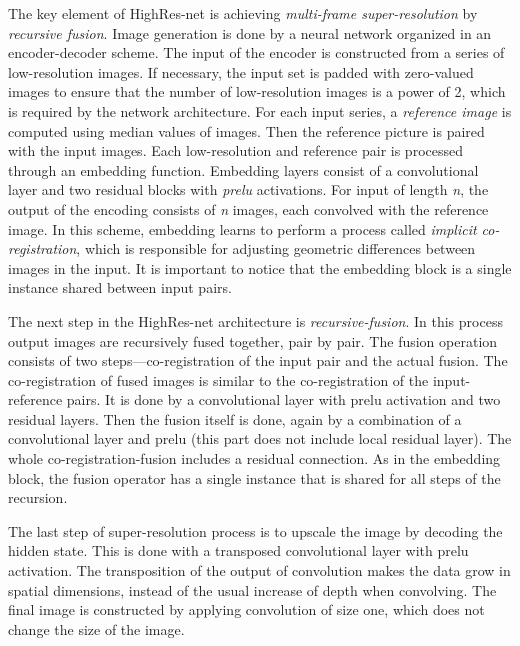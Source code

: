The key element of HighRes-net is achieving \textit{multi-frame super-resolution} by \textit{recursive fusion}.
Image generation is done by a neural network organized in an encoder-decoder scheme.
The input of the encoder is constructed from a series of low-resolution images.
If necessary, the input set is padded with zero-valued images to ensure that the number of low-resolution images is a power of 2, which is required by the network architecture.
For each input series, a \textit{reference image} is computed using median values of images.
Then the reference picture is paired with the input images.
Each low-resolution and reference pair is processed through an embedding function.
Embedding layers consist of a convolutional layer and two residual blocks with \textit{\gls{prelu}} activations.
For input of length \textit{n}, the output of the encoding consists of \textit{n} images, each convolved with the reference image.
In this scheme, embedding learns to perform a process called \textit{implicit co-registration}, which is responsible for adjusting geometric differences between images in the input.
It is important to notice that the embedding block is a single instance shared between input pairs.

The next step in the HighRes-net architecture is \textit{recursive-fusion}.
In this process output images are recursively fused together, pair by pair.
The fusion operation consists of two steps---co-registration of the input pair and the actual fusion.
The co-registration of fused images is similar to the co-registration of the input-reference pairs.
It is done by a convolutional layer with \gls{prelu} activation and two residual layers.
Then the fusion itself is done, again by a combination of a convolutional layer and \gls{prelu} (this part does not include local residual layer).
The whole co-registration-fusion includes a residual connection.
As in the embedding block, the fusion operator has a single instance that is shared for all steps of the recursion.

The last step of super-resolution process is to upscale the image by decoding the hidden state.
This is done with a transposed convolutional layer with \gls{prelu} activation.
The transposition of the output of convolution makes the data grow in spatial dimensions, instead of the usual increase of depth when convolving.
The final image is constructed by applying convolution of size one, which does not change the size of the image.

